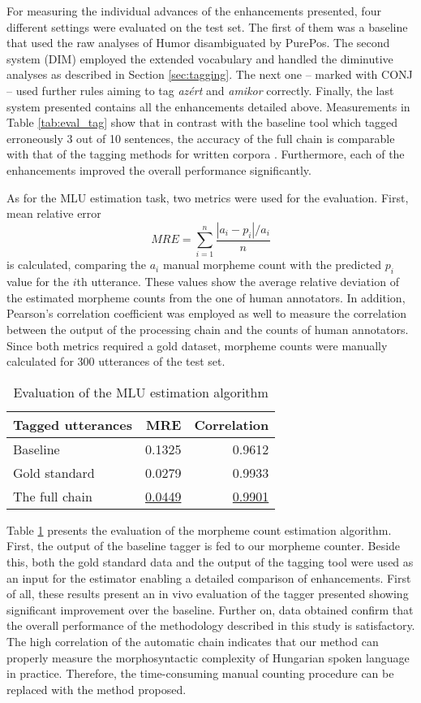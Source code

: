 For measuring the individual advances of the enhancements presented, four different settings were evaluated on the test set. The first of them was a baseline that used the raw analyses of Humor disambiguated by PurePos. The second system (DIM) employed the extended vocabulary and handled the diminutive analyses as described in Section \ref{sec:tagging}. The next one -- marked with CONJ -- used further rules aiming to tag \textit{azért} and \textit{amikor} correctly. Finally, the last system presented contains all the enhancements detailed above. Measurements in Table \ref{tab:eval_tag} show that in contrast with the baseline tool which tagged erroneously 3 out of 10 sentences, the accuracy of the full chain is comparable with that of the tagging methods for written corpora \cite{Zsibrita2013}. Furthermore, each of the enhancements improved the overall performance significantly. 


As for the MLU estimation task, two metrics were used for the evaluation. First, mean relative error
\begin{equation}
MRE = \sum_{i=1}^n \frac{|a_i-p_i|/a_i}{n}
\end{equation}
is calculated, comparing the $a_i$ manual morpheme count with the predicted $p_i$ value for the $i$th utterance. These values show the average relative deviation of the estimated morpheme counts from the one of human annotators. 
In addition, Pearson's correlation coefficient was employed as well to measure the correlation between the output of the processing chain and the counts of human annotators. Since both metrics required a gold dataset, morpheme counts were manually calculated for 300 utterances of the test set.



\begin{table}
\centering
\caption{Evaluation of the MLU estimation algorithm}
\label{tab:eval_est}
\begin{tabular}{ l r r} 
\hline
Tagged utterances & MRE & Correlation \\
\hline
Baseline &  0.1325  &  0.9612 \\
Gold standard &  0.0279 &  0.9933 \\
The full chain & \underline{0.0449} & \underline{0.9901} \\
\hline
\end{tabular}
\end{table}

Table \ref{tab:eval_est} presents the evaluation of the morpheme count estimation algorithm. First, the output of the baseline tagger is fed to our morpheme counter. Beside this, both the gold standard data and the output of the tagging tool were used as an input for the estimator enabling a detailed comparison of enhancements. 
First of all, these results present an in vivo evaluation of the tagger presented showing significant improvement over the baseline.
Further on, data obtained confirm that the overall performance of the methodology described in this study is satisfactory.  
The high correlation of the automatic chain indicates that our method can properly measure the morphosyntactic complexity of Hungarian spoken language in practice. Therefore, the time-consuming manual counting procedure can be replaced with the method proposed.
